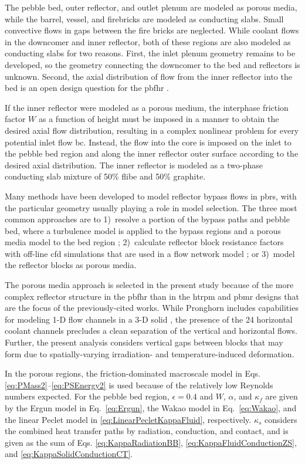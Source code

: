 The pebble bed, outer reflector, and outlet plenum are modeled as porous media, while the barrel, vessel, and firebricks are modeled as conducting slabs. Small convective flows in gaps between the fire bricks are neglected. While coolant flows in the downcomer and inner reflector, both of these regions are also modeled as conducting slabs for two reasons. First, the inlet plenum geometry remains to be developed, so the geometry connecting the downcomer to the bed and reflectors is unknown. Second, the axial distribution of flow from the inner reflector into the bed is an open design question for the \gls{pbfhr} \cite{pbfhr,xin_wang_thesis,scarlat}. 

If the inner reflector were modeled as a porous medium, the interphase friction factor \(W\) as a function of height must be imposed in a manner to obtain the desired axial flow distribution, resulting in a complex nonlinear problem for every potential inlet flow \gls{bc}. Instead, the flow into the core is imposed on the inlet to the pebble bed region and along the inner reflector outer surface according to the desired axial distribution. The inner reflector is modeled as a two-phase conducting slab mixture of 50\% \gls{flibe} and 50\% graphite.

Many methods have been developed to model reflector bypass flows in \glspl{pbr}, with the particular geometry usually playing a role in model selection. The three most common approaches are to 1)~resolve a portion of the bypass paths and pebble bed, where a turbulence model is applied to the bypass regions and a porous media model to the bed region \cite{ximing,rensburg}; 2)~calculate reflector block resistance factors with off-line \gls{cfd} simulations that are used in a flow network model \cite{jun2011, liu_2018,wyk}; or 3)~model the reflector blocks as porous media.

The porous media approach is selected in the present study because of the more complex reflector structure in the \gls{pbfhr} than in the \gls{htrpm} and \gls{pbmr} designs that are the focus of the previously-cited works. While Pronghorn includes capabilities for modeling 1-D flow channels in a 3-D solid \cite{nrc_2020}, the presence of the 24 horizontal coolant channels precludes a clean separation of the vertical and horizontal flows. Further, the present analysis considers vertical gaps between blocks that may form due to spatially-varying irradiation- and temperature-induced deformation. 

In the porous regions, the friction-dominated macroscale model in Eqs. \eqref{eq:PMass2}--\eqref{eq:PSEnergy2} is used because of the relatively low Reynolds numbers expected. For the pebble bed region, \(\epsilon=0.4\) and \(W\), \(\alpha\), and \(\kappa_f\) are given by the Ergun model in Eq.\ \eqref{eq:Ergun}, the Wakao model in Eq.\ \eqref{eq:Wakao}, and the linear Peclet model in \eqref{eq:LinearPecletKappaFluid}, respectively. \(\kappa_s\) considers the combined heat transfer paths by radiation, conduction, and contact, and is given as the sum of Eqs. \eqref{eq:KappaRadiationBB}, \eqref{eq:KappaFluidConductionZS}, and \eqref{eq:KappaSolidConductionCT}. 

